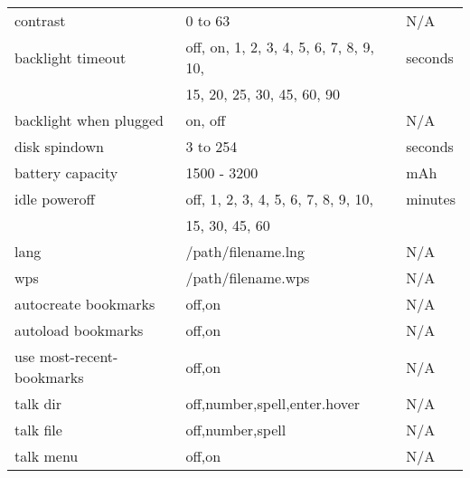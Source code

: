\begin{center}
\begin{longtable}{@{}lll@{}}
     contrast & 0 to 63 & N/A\\
     backlight timeout & off, on, 1, 2, 3, 4, 5, 6, 7, 8, 9, 10, & seconds\\ 
                       & 15, 20, 25, 30, 45, 60, 90 & \\
     backlight when plugged & on, off & N/A\\
     disk spindown & 3 to 254 & seconds\\
     battery capacity & 1500 - 3200 & mAh\\
     idle poweroff & off, 1, 2, 3, 4, 5, 6, 7, 8, 9, 10, & minutes\\
                   & 15, 30, 45, 60 & \\
     lang & /path/filename.lng & N/A\\
     wps & /path/filename.wps & N/A\\
     autocreate bookmarks & off,on & N/A\\
     autoload bookmarks & off,on & N/A\\
     use most-recent-bookmarks & off,on & N/A\\
     talk dir & off,number,spell,enter.hover & N/A\\
     talk file & off,number,spell & N/A\\
     talk menu & off,on & N/A\\\bottomrule
  \end{longtable}
\end{center}

